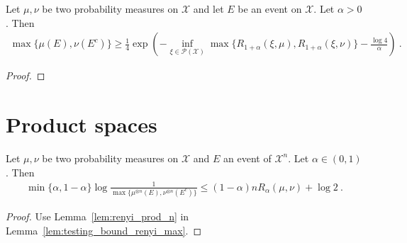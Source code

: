\begin{lemma}
  \label{lem:testing_bound_renyi_one_add}
  Let $\mu, \nu$ be two probability measures on $\mathcal X$ and let $E$ be an event on $\mathcal X$. Let $\alpha > 0$. Then
  \begin{align*}
  \max\{\mu(E), \nu(E^c)\} \ge \frac{1}{4}\exp\left( - \inf_{\xi \in \mathcal P(\mathcal X)}\max\{R_{1+\alpha}(\xi, \mu), R_{1+\alpha}(\xi, \nu)\} - \frac{\log 4}{\alpha}\right) \: .
  \end{align*}
\end{lemma}

\begin{proof}
\end{proof}


\section{Product spaces}

\begin{corollary}
  \label{cor:testing_bound_renyi_n}
  Let $\mu, \nu$ be two probability measures on $\mathcal X$ and $E$ an event of $\mathcal X^n$. Let $\alpha \in (0,1)$. Then
  \begin{align*}
  \min\{\alpha, 1 - \alpha\} \log\frac{1}{\max\{\mu^{\otimes n}(E), \nu^{\otimes n}(E^c)\}} \le (1 - \alpha) n R_{\alpha}(\mu, \nu)  + \log 2 \: .
  \end{align*}
\end{corollary}

\begin{proof}
Use Lemma~\ref{lem:renyi_prod_n} in Lemma~\ref{lem:testing_bound_renyi_max}.
\end{proof}
